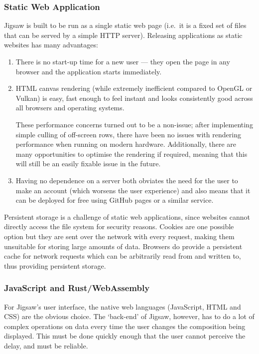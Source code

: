 \documentclass[12pt]{article}
\begin{document}
\subsubsection{Static Web Application}

Jigsaw is built to be run as a single static web page (i.e.\ it is a fixed set of files that can be
served by a simple HTTP server).  Releasing applications as static websites has many advantages:

\begin{enumerate}
    \item There is no start-up time for a new user --- they open the page in any browser and the
        application starts immediately.
    \item HTML canvas rendering (while extremely inefficient compared to OpenGL or Vulkan) is easy,
        fast enough to feel instant and looks consistently good across all browsers and operating
        systems.

        These performance concerns turned out to be a non-issue; after implementing simple culling
        of off-screen rows, there have been no issues with rendering performance when running on
        modern hardware.  Additionally, there are many opportunities to optimise the rendering if
        required, meaning that this will still be an easily fixable issue in the future.
    \item Having no dependence on a server both obviates the need for the user to make an account
        (which worsens the user experience) and also means that it can be deployed for free using
        GitHub pages or a similar service.
\end{enumerate}

Persistent storage is a challenge of static web applications, since websites cannot directly access
the file system for security reasons.  Cookies are one possible option but they are sent over the
network with every request, making them unsuitable for storing large amounts of data.  Browsers do
provide a persistent cache for network requests which can be arbitrarily read from and written to,
thus providing persistent storage.

\subsubsection{JavaScript and Rust/WebAssembly}

For Jigsaw's user interface, the native web languages (JavaScript, HTML and CSS) are the obvious
choice.  The `back-end' of Jigsaw, however, has to do a lot of complex operations on data every time
the user changes the composition being displayed.  This must be done quickly enough that the user
cannot perceive the delay, and must be reliable.
\end{document}
